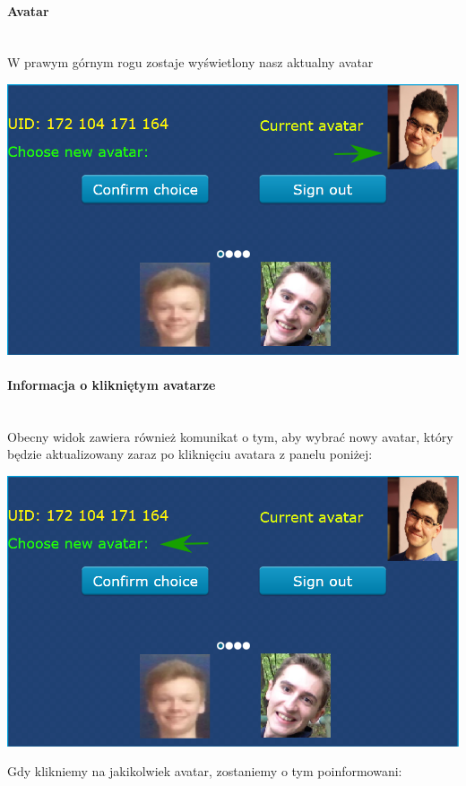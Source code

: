 \documentclass[12pt,hidelinks]{article}
\newcommand{\subsubsubsection}[1]{\paragraph{#1}\mbox{}\\}
\begin{document}
    \subsubsubsection{Avatar}
    W prawym górnym rogu zostaje wyświetlony nasz aktualny avatar

    \begin{center}
        \includegraphics[scale=0.6]{img/screen2-highlighted-avatar.png}
    \end{center}

    \newpage

    \subsubsubsection{Informacja o klikniętym avatarze}
    Obecny widok zawiera również komunikat o tym, aby wybrać nowy avatar, który będzie aktualizowany zaraz po kliknięciu avatara z panelu poniżej:

    \begin{center}
        \includegraphics[scale=0.6]{img/screen2-highlighted-choose-empty.png}
    \end{center}

    Gdy klikniemy na jakikolwiek avatar, zostaniemy o tym poinformowani:
\end{document}
